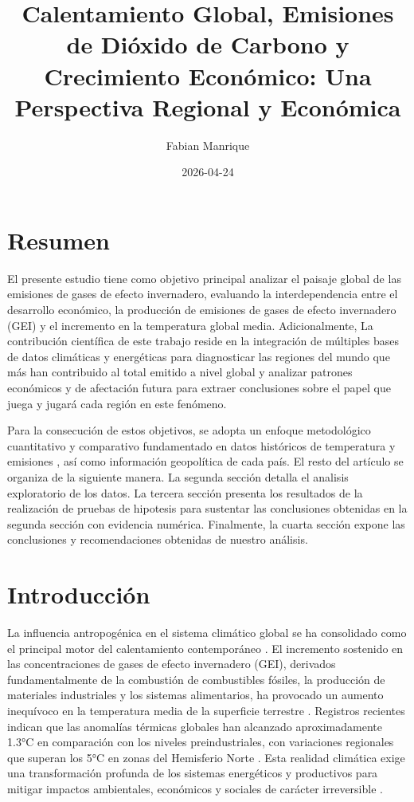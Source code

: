 \documentclass[
]{book}
\title{Calentamiento Global, Emisiones de Dióxido de Carbono y Crecimiento Económico: Una Perspectiva Regional y Económica}
\author{Fabian Manrique}
\date{2026-04-24}
\begin{document}
\maketitle

{
\setcounter{tocdepth}{1}
\tableofcontents
}
\chapter{Resumen}\label{resumen}

El presente estudio tiene como objetivo principal analizar el paisaje global de las emisiones de gases de efecto invernadero, evaluando la interdependencia entre el desarrollo económico, la producción de emisiones de gases de efecto invernadero (GEI) y el incremento en la temperatura global media. Adicionalmente, La contribución científica de este trabajo reside en la integración de múltiples bases de datos climáticas y energéticas para diagnosticar las regiones del mundo que más han contribuido al total emitido a nivel global y analizar patrones económicos y de afectación futura para extraer conclusiones sobre el papel que juega y jugará cada región en este fenómeno.

Para la consecución de estos objetivos, se adopta un enfoque metodológico cuantitativo y comparativo fundamentado en datos históricos de temperatura y emisiones \citep{ref155}, así como información geopolítica de cada país. El resto del artículo se organiza de la siguiente manera. La segunda sección detalla el analisis exploratorio de los datos. La tercera sección presenta los resultados de la realización de pruebas de hipotesis para sustentar las conclusiones obtenidas en la segunda sección con evidencia numérica. Finalmente, la cuarta sección expone las conclusiones y recomendaciones obtenidas de nuestro análisis.

\chapter{Introducción}\label{introducciuxf3n}

La influencia antropogénica en el sistema climático global se ha consolidado como el principal motor del calentamiento contemporáneo \citep{ref1}. El incremento sostenido en las concentraciones de gases de efecto invernadero (GEI), derivados fundamentalmente de la combustión de combustibles fósiles, la producción de materiales industriales y los sistemas alimentarios, ha provocado un aumento inequívoco en la temperatura media de la superficie terrestre \citep{ref81}. Registros recientes indican que las anomalías térmicas globales han alcanzado aproximadamente 1.3°C en comparación con los niveles preindustriales, con variaciones regionales que superan los 5°C en zonas del Hemisferio Norte \citep{ref5}. Esta realidad climática exige una transformación profunda de los sistemas energéticos y productivos para mitigar impactos ambientales, económicos y sociales de carácter irreversible \citep{ref142}.
\end{document}

